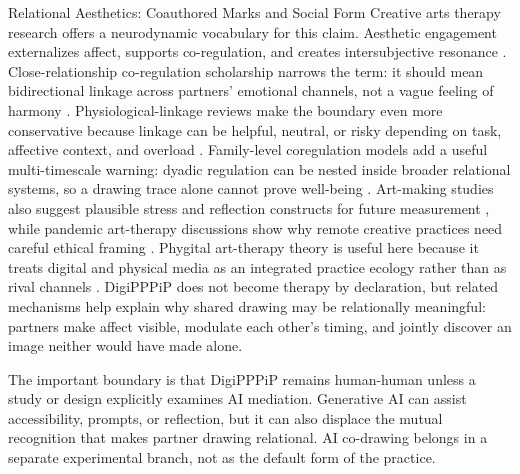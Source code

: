 \documentclass[
  ignorenonframetext,
]{beamer}
\begin{document}
\begin{frame}[allowframebreaks]{Relational Aesthetics: Coauthored Marks
and Social Form}
Creative arts therapy research offers a neurodynamic vocabulary for this
claim. Aesthetic engagement externalizes affect, supports co-regulation,
and creates intersubjective resonance .
Close-relationship co-regulation scholarship narrows the term: it should
mean bidirectional linkage across partners' emotional channels, not a
vague feeling of harmony .
Physiological-linkage reviews make the boundary even more conservative
because linkage can be helpful, neutral, or risky depending on task,
affective context, and overload .
Family-level coregulation models add a useful multi-timescale warning:
dyadic regulation can be nested inside broader relational systems, so a
drawing trace alone cannot prove well-being
. Art-making studies also suggest
plausible stress and reflection constructs for future measurement
, while pandemic art-therapy discussions show
why remote creative practices need careful ethical framing
. Phygital art-therapy theory is useful here
because it treats digital and physical media as an integrated practice
ecology rather than as rival channels . DigiPPPiP
does not become therapy by declaration, but related mechanisms help
explain why shared drawing may be relationally meaningful: partners make
affect visible, modulate each other's timing, and jointly discover an
image neither would have made alone.

The important boundary is that DigiPPPiP remains human-human unless a
study or design explicitly examines AI mediation. Generative AI can
assist accessibility, prompts, or reflection, but it can also displace
the mutual recognition that makes partner drawing relational. AI
co-drawing belongs in a separate experimental branch, not as the default
form of the practice.
\end{frame}
\end{document}
